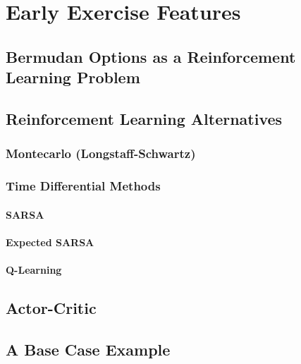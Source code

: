\chapter{Early Exercise Features}
\label{chap:MarketRisk}

\section{Bermudan Options as a Reinforcement Learning Problem}

\section{Reinforcement Learning Alternatives}
\subsection{Montecarlo (Longstaff-Schwartz)}
\subsection{Time Differential Methods}
\subsubsection{SARSA}
\subsubsection{Expected SARSA}
\subsubsection{Q-Learning}
\section{Actor-Critic}
\section{A Base Case Example}